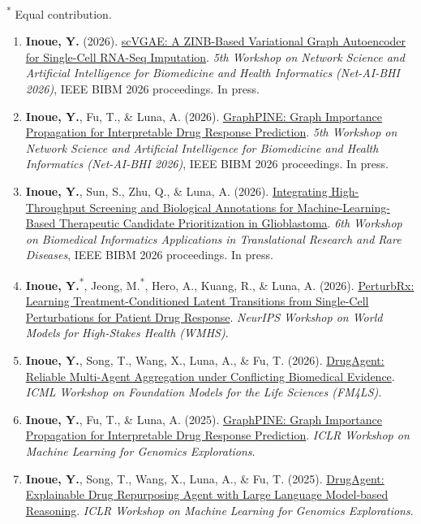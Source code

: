 \documentclass[11pt]{article}
\begin{document}
{\small\textsuperscript{*} Equal contribution.}\par
\begin{enumerate}[label={C\arabic*.}]
    \entryspace\item \textbf{Inoue, Y.} (2026).
    \href{https://arxiv.org/abs/2403.08959}{scVGAE: A ZINB-Based Variational Graph Autoencoder for Single-Cell RNA-Seq Imputation}.
    \textit{5th Workshop on Network Science and Artificial Intelligence for Biomedicine and Health Informatics (Net-AI-BHI 2026)}, IEEE BIBM 2026 proceedings. In press.
    \entryspace\item \textbf{Inoue, Y.}, Fu, T., \& Luna, A. (2026).
    \href{https://arxiv.org/abs/2504.05454}{GraphPINE: Graph Importance Propagation for Interpretable Drug Response Prediction}.
    \textit{5th Workshop on Network Science and Artificial Intelligence for Biomedicine and Health Informatics (Net-AI-BHI 2026)}, IEEE BIBM 2026 proceedings. In press.

    \entryspace\item \textbf{Inoue, Y.}, Sun, S., Zhu, Q., \& Luna, A. (2026).
    \href{https://inoue0426.github.io/publications/}{Integrating High-Throughput Screening and Biological Annotations for Machine-Learning-Based Therapeutic Candidate Prioritization in Glioblastoma}.
    \textit{6th Workshop on Biomedical Informatics Applications in Translational Research and Rare Diseases}, IEEE BIBM 2026 proceedings. In press.

    \entryspace\item \textbf{Inoue, Y.}\textsuperscript{*}, Jeong, M.\textsuperscript{*}, Hero, A., Kuang, R., \& Luna, A. (2026).
    \href{https://inoue0426.github.io/publications/}{PerturbRx: Learning Treatment-Conditioned Latent Transitions from Single-Cell Perturbations for Patient Drug Response}.
    \textit{NeurIPS Workshop on World Models for High-Stakes Health (WMHS)}. 

    \entryspace\item \textbf{Inoue, Y.}, Song, T., Wang, X., Luna, A., \& Fu, T. (2026).
    \href{https://openreview.net/pdf/7ea9d0e9f6243b1dc17b5c362c9c46a9837e21b8.pdf}{DrugAgent: Reliable Multi-Agent Aggregation under Conflicting Biomedical Evidence}.
    \textit{ICML Workshop on Foundation Models for the Life Sciences (FM4LS)}. 

    \entryspace\item \textbf{Inoue, Y.}, Fu, T., \& Luna, A. (2025).
    \href{https://openreview.net/pdf?id=nZ8IjQcJsD}{GraphPINE: Graph Importance Propagation for Interpretable Drug Response Prediction}.
    \textit{ICLR Workshop on Machine Learning for Genomics Explorations}. 

    \entryspace\item \textbf{Inoue, Y.}, Song, T., Wang, X., Luna, A., \& Fu, T. (2025).
    \href{https://openreview.net/pdf?id=QcujughqCJ}{DrugAgent: Explainable Drug Repurposing Agent with Large Language Model-based Reasoning}.
    \textit{ICLR Workshop on Machine Learning for Genomics Explorations}. 
\end{enumerate}
\end{document}
